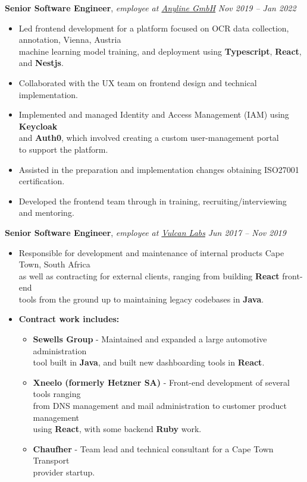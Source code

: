 \documentclass[9pt]{extarticle}
\begin{document}
\noindent
{\bf Senior Software Engineer}, \textit{employee at \href{https://anyline.com}{Anyline GmbH}}  \hfill \textit{Nov 2019 -- Jan 2022}
\begin{itemize}
\setlength\itemsep{0.05em}

\item Led frontend development for a platform focused on OCR data collection, annotation, \hfill Vienna, Austria \\
machine learning model training, and deployment using \textbf{Typescript}, \textbf{React}, and \textbf{Nestjs}.
\item Collaborated with the UX team on frontend design and technical implementation.
\item Implemented and managed Identity and Access Management (IAM) using \textbf{Keycloak} \\
and \textbf{Auth0}, which involved creating a custom user-management portal \\
to support the platform.
\item Assisted in the preparation and implementation changes obtaining ISO27001 \\
certification.
\item Developed the frontend team through in training, recruiting/interviewing \\
and mentoring.

\end{itemize}

\noindent
{\bf Senior Software Engineer}, \textit{employee at \href{https://vulcanlabs.com/}{Vulcan Labs}}  \hfill \textit{Jun 2017 -- Nov 2019}
\begin{itemize}
\setlength\itemsep{0.05em}

\item Responsible for development and maintenance of internal products \hfill Cape Town, South Africa \\
as well as contracting for external clients, ranging from building \textbf{React} front-end \\
tools from the ground up to maintaining legacy codebases in \textbf{Java}.
\item \textbf{Contract work includes:}
  \begin{itemize}
    \item \textbf{Sewells Group} - Maintained and expanded a large automotive administration \\
    tool built in \textbf{Java}, and built new dashboarding tools in \textbf{React}.
    \item \textbf{Xneelo (formerly Hetzner SA)} - Front-end development of several tools ranging \\
    from DNS management and mail administration to customer product management \\
    using \textbf{React}, with some backend \textbf{Ruby} work.
    \item \textbf{Chaufher} - Team lead and technical consultant for a Cape Town Transport \\
    provider startup.
  \end{itemize}
\end{itemize}
\end{document}
